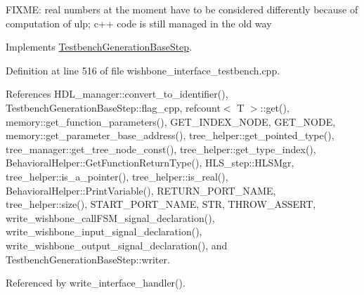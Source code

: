F\+I\+X\+ME\+: real numbers at the moment have to be considered differently because of computation of ulp; c++ code is still managed in the old way 

Implements \hyperlink{classTestbenchGenerationBaseStep_af4bf6836e809359aa23a892ea16c08df}{Testbench\+Generation\+Base\+Step}.



Definition at line 516 of file wishbone\+\_\+interface\+\_\+testbench.\+cpp.



References H\+D\+L\+\_\+manager\+::convert\+\_\+to\+\_\+identifier(), Testbench\+Generation\+Base\+Step\+::flag\+\_\+cpp, refcount$<$ T $>$\+::get(), memory\+::get\+\_\+function\+\_\+parameters(), G\+E\+T\+\_\+\+I\+N\+D\+E\+X\+\_\+\+N\+O\+DE, G\+E\+T\+\_\+\+N\+O\+DE, memory\+::get\+\_\+parameter\+\_\+base\+\_\+address(), tree\+\_\+helper\+::get\+\_\+pointed\+\_\+type(), tree\+\_\+manager\+::get\+\_\+tree\+\_\+node\+\_\+const(), tree\+\_\+helper\+::get\+\_\+type\+\_\+index(), Behavioral\+Helper\+::\+Get\+Function\+Return\+Type(), H\+L\+S\+\_\+step\+::\+H\+L\+S\+Mgr, tree\+\_\+helper\+::is\+\_\+a\+\_\+pointer(), tree\+\_\+helper\+::is\+\_\+real(), Behavioral\+Helper\+::\+Print\+Variable(), R\+E\+T\+U\+R\+N\+\_\+\+P\+O\+R\+T\+\_\+\+N\+A\+ME, tree\+\_\+helper\+::size(), S\+T\+A\+R\+T\+\_\+\+P\+O\+R\+T\+\_\+\+N\+A\+ME, S\+TR, T\+H\+R\+O\+W\+\_\+\+A\+S\+S\+E\+RT, write\+\_\+wishbone\+\_\+call\+F\+S\+M\+\_\+signal\+\_\+declaration(), write\+\_\+wishbone\+\_\+input\+\_\+signal\+\_\+declaration(), write\+\_\+wishbone\+\_\+output\+\_\+signal\+\_\+declaration(), and Testbench\+Generation\+Base\+Step\+::writer.



Referenced by write\+\_\+interface\+\_\+handler().

